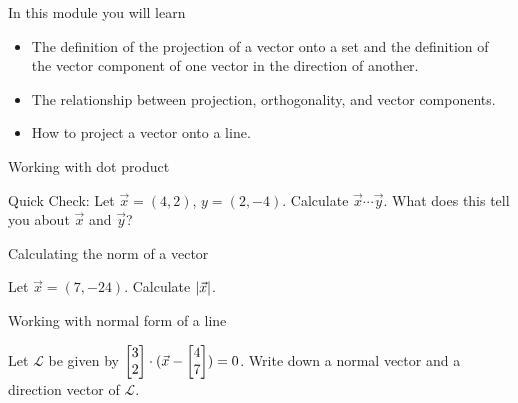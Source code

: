 \begin{module}

	In this module you will learn
	\begin{itemize}
		\item The definition of the projection of a vector onto a set and the definition of the vector component of one vector
			in the direction of another.
		\item The relationship between projection, orthogonality, and vector components.
		\item How to project a vector onto a line.
	\end{itemize}

	\begin{beforeyouread}
		\item Working with dot product

		\item[] Quick Check: Let $\vec x=(4,2)$, $y=(2,-4)$. Calculate
			$\vec x\cdots \vec y$. What does this tell you about $\vec x$ and $\vec y$?

		\item Calculating the norm of a vector

		\item[] Let $\vec x=(7,-24)$. Calculate $\lvert\vec x\rvert$.

		\item Working with normal form of a line

		\item[] Let $\mathcal{L}$ be given by $\mat{3 \\ 2}\cdot (\vec x-\mat{4 \\ 7}
			)=0$. Write down a normal vector and a direction vector of $\mathcal{L}$.
	\end{beforeyouread}

	
	

\end{module}
